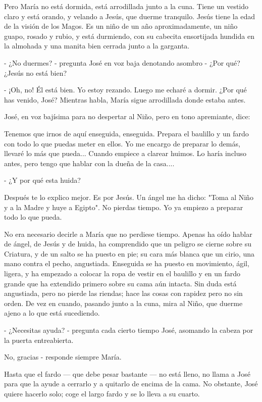\documentclass[12pt]{book} %
\begin{document}
Pero María no está dormida, está arrodillada junto a la cuna. Tiene un vestido claro y está orando, y velando a Jesús, que duerme tranquilo. Jesús tiene la edad de la visión de los Magos. Es un niño de un año aproximadamente, un niño guapo, rosado y rubio, y está durmiendo, con su cabecita ensortijada hundida en la almohada y una manita bien cerrada junto a la garganta. 

- ¿No duermes? - pregunta José en voz baja denotando asombro - ¿Por qué? ¿Jesús no está bien? 

- ¡Oh, no! Él está bien. Yo estoy rezando. Luego me echaré a dormir. ¿Por qué has venido, José? Mientras habla, María sigue arrodillada donde estaba antes. 

José, en voz bajísima para no despertar al Niño, pero en tono apremiante, dice: 

Tenemos que irnos de aquí enseguida, enseguida. Prepara el baulillo y un fardo con todo lo que puedas meter en ellos. Yo me encargo de preparar lo demás, llevaré lo más que pueda... Cuando empiece a clarear huimos. Lo haría incluso antes, pero tengo que hablar con la dueña de la casa.... 

- ¿Y por qué esta huida? 

Después te lo explico mejor. Es por Jesús. Un ángel me ha dicho: "Toma al Niño y a la Madre y huye a Egipto". No pierdas tiempo. Yo ya empiezo a preparar todo lo que pueda. 

No era necesario decirle a María que no perdiese tiempo. Apenas ha oído hablar de ángel, de Jesús y de huida, ha comprendido que un peligro se cierne sobre su Criatura, y de un salto se ha puesto en pie; su cara más blanca que un cirio, una mano contra el pecho, angustiada. Enseguida se ha puesto en movimiento, ágil, ligera, y ha empezado a colocar la ropa de vestir en el baulillo y en un fardo grande que ha extendido primero sobre su cama aún intacta. Sin duda está angustiada, pero no pierde las riendas; hace las cosas con rapidez pero no sin orden. De vez en cuando, pasando junto a la cuna, mira al Niño, que duerme ajeno a lo que está sucediendo. 

- ¿Necesitas ayuda? - pregunta cada cierto tiempo José, asomando la cabeza por la puerta entreabierta. 

No, gracias - responde siempre María. 

Hasta que el fardo — que debe pesar bastante — no está lleno, no llama a José para que la ayude a cerrarlo y a quitarlo de encima de la cama. No obstante, José quiere hacerlo solo; coge el largo fardo y se lo lleva a su cuarto. 
\end{document}
